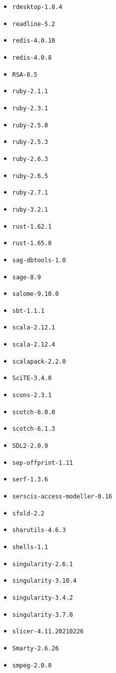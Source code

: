 \begin{multicols}{3}
\begin{itemize}
\item \verb|rdesktop-1.8.4|
\item \verb|readline-5.2|
\item \verb|redis-4.0.10|
\item \verb|redis-4.0.8|
\item \verb|RSA-8.5|
\item \verb|ruby-2.1.1|
\item \verb|ruby-2.3.1|
\item \verb|ruby-2.5.0|
\item \verb|ruby-2.5.3|
\item \verb|ruby-2.6.3|
\item \verb|ruby-2.6.5|
\item \verb|ruby-2.7.1|
\item \verb|ruby-3.2.1|
\item \verb|rust-1.62.1|
\item \verb|rust-1.65.0|
\item \verb|sag-dbtools-1.0|
\item \verb|sage-8.9|
\item \verb|salome-9.10.0|
\item \verb|sbt-1.1.1|
\item \verb|scala-2.12.1|
\item \verb|scala-2.12.4|
\item \verb|scalapack-2.2.0|
\item \verb|SciTE-3.4.0|
\item \verb|scons-2.3.1|
\item \verb|scotch-6.0.0|
\item \verb|scotch-6.1.3|
\item \verb|SDL2-2.0.9|
\item \verb|sep-offprint-1.11|
\item \verb|serf-1.3.6|
\item \verb|serscis-access-modeller-0.16|
\item \verb|sfold-2.2|
\item \verb|sharutils-4.6.3|
\item \verb|shells-1.1|
\item \verb|singularity-2.6.1|
\item \verb|singularity-3.10.4|
\item \verb|singularity-3.4.2|
\item \verb|singularity-3.7.0|
\item \verb|slicer-4.11.20210226|
\item \verb|Smarty-2.6.26|
\item \verb|smpeg-2.0.0|

\end{itemize}
\end{multicols}
